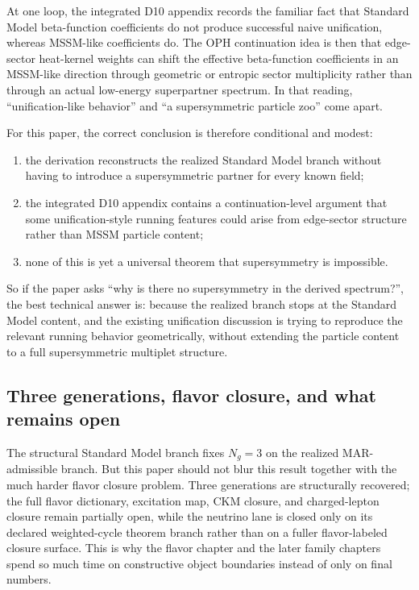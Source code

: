 \documentclass[11pt]{article}
\begin{document}
At one loop, the integrated D10 appendix records the familiar fact that Standard Model beta-function
coefficients do not produce successful naive unification, whereas MSSM-like coefficients do. The
OPH continuation idea is then that edge-sector heat-kernel weights can shift the effective
beta-function coefficients in an MSSM-like direction through geometric or entropic sector
multiplicity rather than through an actual low-energy superpartner spectrum. In that reading,
``unification-like behavior'' and ``a supersymmetric particle zoo'' come apart.

For this paper, the correct conclusion is therefore conditional and modest:
\begin{enumerate}[leftmargin=2em]
\item the derivation reconstructs the realized Standard Model branch without having to
introduce a supersymmetric partner for every known field;
\item the integrated D10 appendix contains a continuation-level argument that some unification-style running
features could arise from edge-sector structure rather than MSSM particle content;
\item none of this is yet a universal theorem that supersymmetry is impossible.
\end{enumerate}

So if the paper asks ``why is there no supersymmetry in the derived spectrum?'', the best
technical answer is: because the realized branch stops at the Standard
Model content, and the existing unification discussion is trying to reproduce the relevant
running behavior geometrically, without extending the particle content to a full
supersymmetric multiplet structure.

\subsection{Three generations, flavor closure, and what remains open}

The structural Standard Model branch fixes \(N_g=3\) on the realized MAR-admissible
branch. But this paper should not blur this result together with the much harder flavor
closure problem. Three generations are structurally recovered; the full flavor dictionary,
excitation map, CKM closure, and charged-lepton closure remain partially open, while the neutrino
lane is closed only on its declared weighted-cycle theorem branch rather than on a fuller
flavor-labeled closure surface.
This is why the flavor chapter and the later family chapters spend so much time on
constructive object boundaries instead of only on final numbers.
\end{document}
